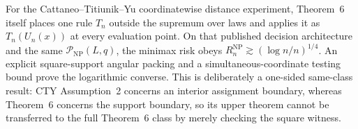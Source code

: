For the Cattaneo--Titiunik--Yu coordinatewise distance experiment, Theorem~6 itself places one rule \(T_n\) outside the supremum over laws and applies it as \(T_n(U_n(x))\) at every evaluation point.  On that published decision architecture and the same \(\mathcal P_{\mathrm{NP}}(L,q)\), the minimax risk obeys \(R_n^{\mathrm{NP}}\gtrsim(\log n/n)^{1/4}\).  An explicit square-support angular packing and a simultaneous-coordinate testing bound prove the logarithmic converse.  This is deliberately a one-sided same-class result: CTY Assumption~2 concerns an interior assignment boundary, whereas Theorem~6 concerns the support boundary, so its upper theorem cannot be transferred to the full Theorem~6 class by merely checking the square witness.